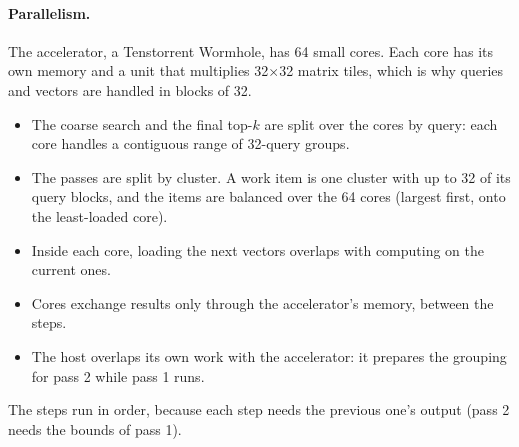 \paragraph{Parallelism.} The accelerator, a Tenstorrent Wormhole, has 64 small
cores. Each core has its own memory and a unit that multiplies 32\(\times\)32
matrix tiles, which is why queries and vectors are handled in blocks of 32.
\begin{itemize}
  \item The coarse search and the final top-\(k\) are split over the cores by
    query: each core handles a contiguous range of 32-query groups.
  \item The passes are split by cluster. A work item is one cluster with up to
    32 of its query blocks, and the items are balanced over the 64 cores
    (largest first, onto the least-loaded core).
  \item Inside each core, loading the next vectors overlaps with computing on
    the current ones.
  \item Cores exchange results only through the accelerator's memory, between
    the steps.
  \item The host overlaps its own work with the accelerator: it prepares the
    grouping for pass 2 while pass 1 runs.
\end{itemize}
The steps run in order, because each step needs the previous one's output
(pass 2 needs the bounds of pass 1).
